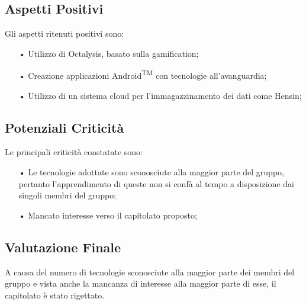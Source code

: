\subsection{Aspetti Positivi}
Gli aspetti ritenuti positivi sono: 
\begin{itemize}
\item[•] Utilizzo di Octalysis, basato sulla gamification;
\item[•] Creazione applicazioni Android\textsuperscript{TM} con tecnologie all'avanguardia;
\item[•] Utilizzo di un sistema cloud per l'immagazzinamento dei dati come Hensin;
\end{itemize}
\subsection{Potenziali Criticità}
Le principali criticità constatate sono:
\begin{itemize}
\item[•] Le tecnologie adottate sono sconosciute alla maggior parte del gruppo, pertanto l'apprendimento di queste non si confà al tempo a disposizione dai singoli membri del gruppo; 
\item[•] Mancato interesse verso il capitolato proposto;
\end{itemize}
\subsection{Valutazione Finale}
A causa del numero di tecnologie sconosciute alla maggior parte dei membri del gruppo e vista anche la mancanza di interesse alla maggior parte di esse, il capitolato è stato rigettato.

